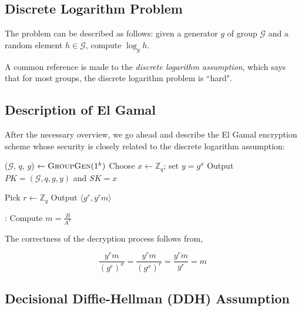 \subsection{Discrete Logarithm Problem}

The problem can be described as follows: given a generator $ g $ of group $ \mathcal{G} $ and a random element $ h \in \mathcal{G} $, compute $ \log_g h $.

A common reference is made to the \textit{discrete logarithm assumption}, which says that for most groups, the discrete logarithm problem is ``hard".

\subsection{Description of El Gamal}

After the necessary overview, we go ahead and describe the El Gamal encryption scheme whose security is closely related to the discrete logarithm assumption:

\begin{algorithmic}
\STATE ($ \mathcal{G} $, $ q $, $ g $) $ \leftarrow \textsc{GroupGen} (1^k) $ 
\STATE Choose $ x \leftarrow \mathbb{Z}_q $; set $ y = g^x $ 
\STATE Output $ PK = ( \mathcal{G}, q, g, y) $ and $ SK = x $ 
\end{algorithmic}

\begin{algorithmic}
\STATE Pick $ r \leftarrow \mathbb{Z}_q $ 
\STATE Output $ \langle g^r, y^r m \rangle $ 
\end{algorithmic}

\begin{algorithmic}
:
\STATE Compute $ m = \frac{B}{A^x} $ 
\end{algorithmic}

The correctness of the decryption process follows from,

\begin{equation*}
\frac{y^r m}{(g^r)^x} = \frac{y^r m}{(g^x)^r} = \frac{y^r m }{y^r} = m
\end{equation*}

\subsection{Decisional Diffie-Hellman (DDH) Assumption}
